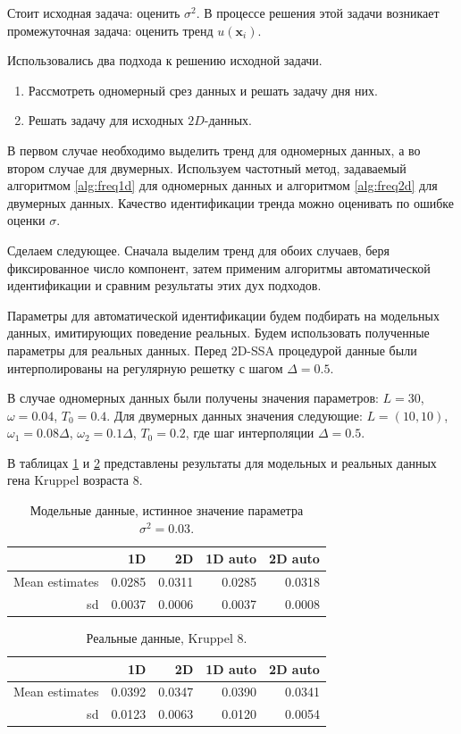 \documentclass[specialist,
               substylefile = spbu.rtx,
               subf,href,colorlinks=true, 12pt]{disser}
\begin{document}
{{Стоит исходная задача: оценить $\sigma^2$. В процессе решения этой задачи возникает промежуточная задача: оценить тренд $ u(\mathbf{x}_i)$.

Использовались два подхода к решению исходной задачи. 
\begin{enumerate}
  \item Рассмотреть одномерный срез данных и решать задачу дня них.
  \item Решать задачу для исходных $2D$-данных.
\end{enumerate}
В первом случае необходимо выделить тренд для одномерных данных, а во втором случае для двумерных.
Используем частотный метод, задаваемый алгоритмом \ref{alg:freq1d} для одномерных данных и алгоритмом \ref{alg:freq2d} для двумерных данных.
Качество идентификации тренда можно оценивать по ошибке оценки $\sigma$.

Сделаем следующее. Сначала выделим тренд для обоих случаев, беря фиксированное число компонент, затем применим алгоритмы автоматической идентификации и сравним результаты этих дух подходов.  

Параметры для автоматической идентификации будем подбирать на модельных данных, 
имитирующих поведение реальных. Будем использовать полученные параметры для реальных данных.  
Перед 2D-SSA процедурой данные были интерполированы на регулярную решетку с шагом $\Delta = 0.5$.

В случае одномерных данных были получены значения параметров: $L=30$, $\omega=0.04$, $T_0=0.4$.
Для двумерных данных значения следующие:  $L=(10,10)$, $\omega_{1}=0.08 \Delta$,
  $\omega_{2}=0.1 \Delta$, $T_0=0.2$, где шаг интерполяции $\Delta = 0.5$. 

В таблицах \ref{tab:model_est_compare} и \ref{tab:real_est_compare} представлены результаты для модельных и реальных данных гена Kruppel возраста 8.

 \begin{table}[hhh!]
\caption{Модельные данные, истинное значение параметра $\sigma^2=0.03$.}
 \centering
 \begin{tabular}{rrrrr}
  \hline
  & 1D  & 2D  & 1D auto  & 2D auto \\
  \hline
  Mean estimates & 0.0285 & 0.0311 & 0.0285 & 0.0318 \\
  sd & 0.0037 & 0.0006 & 0.0037 & 0.0008 \\
 \end{tabular}
  \label{tab:model_est_compare}
 \end{table}    
  \begin{table}[hhh!]
\caption{Реальные данные, Kruppel 8.}
 \centering
 \begin{tabular}{rrrrr}
  \hline
  & 1D  & 2D   & 1D auto & 2D auto \\
  \hline
  Mean estimates & 0.0392 & 0.0347 & 0.0390 & 0.0341 \\
  sd & 0.0123 & 0.0063 & 0.0120 & 0.0054 \\
 \end{tabular}
 \label{tab:real_est_compare}
 \end{table}

}}
\end{document}
